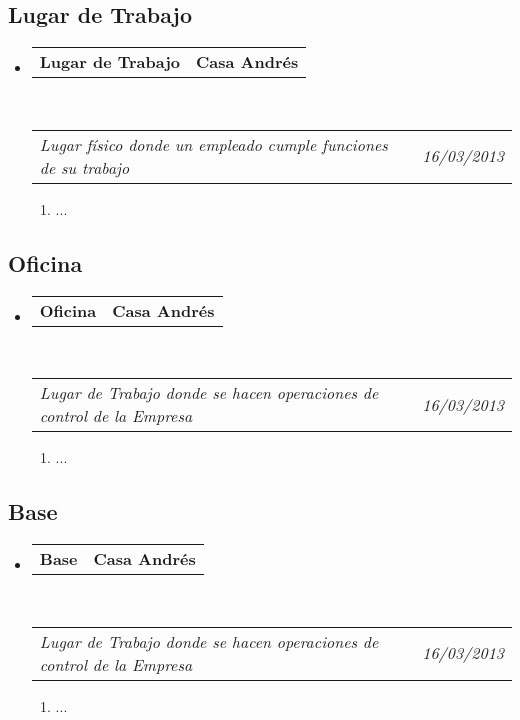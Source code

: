 \documentclass[10pt,letterpaper]{article}
\makeatletter
\newcommand{\headerrow}[2]
{\begin{tabular*}{\linewidth}{l@{\extracolsep{\fill}}r}
	#1 &
	#2 \\
\end{tabular*}}
\makeatother
\begin{document}
\subsection*{Lugar de Trabajo}

\begin{itemize}
	\parskip=0.1em

	\item
	\headerrow
		{\textbf{Lugar de Trabajo}}
		{\textbf{Casa Andrés}}
	\\
	\headerrow
		{\emph{Lugar físico donde un empleado cumple funciones de su trabajo}}
		{\emph{16/03/2013}}
	\begin{enumerate}
		\item ...
	\end{enumerate}

\end{itemize}

\subsection*{Oficina}

\begin{itemize}
	\parskip=0.1em

	\item
	\headerrow
		{\textbf{Oficina}}
		{\textbf{Casa Andrés}}
	\\
	\headerrow
		{\emph{Lugar de Trabajo donde se hacen operaciones de control de la Empresa}}
		{\emph{16/03/2013}}
	\begin{enumerate}
		\item ...
	\end{enumerate}

\end{itemize}

\subsection*{Base}

\begin{itemize}
	\parskip=0.1em

	\item
	\headerrow
		{\textbf{Base}}
		{\textbf{Casa Andrés}}
	\\
	\headerrow
		{\emph{Lugar de Trabajo donde se hacen operaciones de control de la Empresa}}
		{\emph{16/03/2013}}
	\begin{enumerate}
		\item ...
	\end{enumerate}

\end{itemize}
\end{document}

